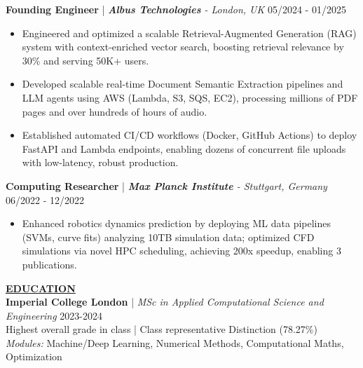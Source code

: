 \documentclass{article}
\newlength{\remaining}
\renewcommand{\section}[1]{
  \vspace{1.0em}\setlength{\remaining}{\textwidth-\widthof{\uppercase{#1}}}
    \noindent\underline{\fontsize{10}{15}\bfseries\uppercase{#1}\hspace*{\remaining}} \\
}
\renewcommand{\subsection}[3]{
    \noindent\textbf{#1} | \emph{#2} \hfill #3  
}
\begin{document}
    \subsection{Founding Engineer}{\textbf{Albus Technologies} - London, UK}{05/2024 - 01/2025}
    \begin{itemize}
        \item Engineered and optimized a scalable Retrieval-Augmented Generation (RAG) system with context-enriched vector search, boosting retrieval relevance by 30\% and serving 50K+ users.
        \item Developed scalable real-time Document Semantic Extraction pipelines and LLM agents using AWS (Lambda, S3, SQS, EC2), processing millions of PDF pages and over hundreds of hours of audio.
        \item Established automated CI/CD workflows (Docker, GitHub Actions) to deploy FastAPI and Lambda endpoints, enabling dozens of concurrent file uploads with low-latency, robust production.
    \end{itemize}
    

    \subsection{Computing Researcher}{\textbf{Max Planck Institute} - Stuttgart, Germany}{06/2022 - 12/2022}
    \begin{itemize}
        \item Enhanced robotics dynamics prediction by deploying ML data pipelines (SVMs, curve fits) analyzing 10TB simulation data; optimized CFD simulations via novel HPC scheduling, achieving 200x speedup, enabling 3 publications.
    \end{itemize}

    
    \section{Education}
    \subsection{Imperial College London}{MSc in Applied Computational Science and Engineering}{2023-2024} \\
    Highest overall grade in class | Class representative  \hfill Distinction (78.27\%) \\
    \textit{Modules:} Machine/Deep Learning, Numerical Methods, Computational Maths, Optimization
    
\end{document}
